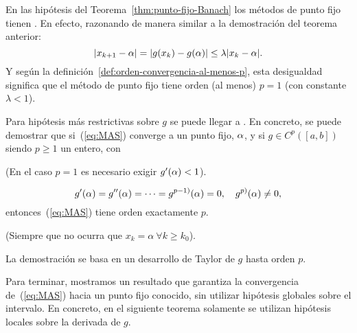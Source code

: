 \begin{remark}
  En las hipótesis del Teorema~\ref{thm:punto-fijo-Banach} los métodos
  de punto fijo tienen . En efecto, razonando de manera similar a la demostración del
  teorema anterior:
  $$
  |x_{k+1}-\alpha|=|g(x_{k})-g(\alpha)|\le\lambda |x_{k}-\alpha|.
  $$
  Y según la definición~\ref{def:orden-convergencia-al-menos-p}, esta
  desigualdad significa que el método de punto fijo tiene orden (al
  menos) $p=1$ (con constante $\lambda<1$).
\end{remark}
\begin{remark}
  Para hipótesis más restrictivas sobre $g$ se puede llegar a
  . En concreto, se puede demostrar
  que si~(\ref{eq:MAS}) converge a un punto fijo, $\alpha$, y si
  $g\in C^p([a,b])$ siendo $p \ge 1$ un entero, con
  \begin{extension}
    (En el caso $p=1$ es necesario exigir $g'(\alpha)<1$).
  \end{extension}
  \begin{equation*}
    g'(\alpha)=g''(\alpha)=\cdots=g^{p-1)}(\alpha)=0, \quad
    g^{p)}(\alpha)\neq 0,
  \end{equation*}
  entonces~(\ref{eq:MAS}) tiene orden exactamente $p$.
  \begin{extension}
    (Siempre que no ocurra que $x_k=\alpha\ \forall k\ge k_0$).
  \end{extension}
  La demostración se basa en un desarrollo de Taylor de $g$ hasta
  orden $p$.
  \label{rk:MAS.orden.p}
\end{remark}
Para terminar, mostramos un resultado que garantiza la convergencia
de~(\ref{eq:MAS}) hacia un punto fijo conocido, sin utilizar hipótesis
globales sobre el intervalo. En concreto, en el siguiente teorema
solamente se utilizan hipótesis locales sobre la derivada de $g$.

